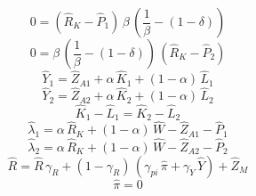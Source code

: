 \begin{dmath}
0=\left({{\hat{R}_{K}}}-{{\hat{P}_{1}}}\right)\, {{\beta}}\, \left(\frac{1}{{{\beta}}}-\left(1-{{\delta}}\right)\right)
\end{dmath}
\begin{dmath}
0={{\beta}}\, \left(\frac{1}{{{\beta}}}-\left(1-{{\delta}}\right)\right)\, \left({{\hat{R}_{K}}}-{{\hat{P}_{2}}}\right)
\end{dmath}
\begin{dmath}
{{\hat{Y}_{1}}}={{\hat{Z}_{A1}}}+{{\alpha}}\, {{\hat{K}_{1}}}+\left(1-{{\alpha}}\right)\, {{\hat{L}_{1}}}
\end{dmath}
\begin{dmath}
{{\hat{Y}_{2}}}={{\hat{Z}_{A2}}}+{{\alpha}}\, {{\hat{K}_{2}}}+\left(1-{{\alpha}}\right)\, {{\hat{L}_{2}}}
\end{dmath}
\begin{dmath}
{{\hat{K}_{1}}}-{{\hat{L}_{1}}}={{\hat{K}_{2}}}-{{\hat{L}_{2}}}
\end{dmath}
\begin{dmath}
{{\hat{\lambda}_{1}}}={{\alpha}}\, {{\hat{R}_{K}}}+\left(1-{{\alpha}}\right)\, {{\hat{W}}}-{{\hat{Z}_{A1}}}-{{\hat{P}_{1}}}
\end{dmath}
\begin{dmath}
{{\hat{\lambda}_{2}}}={{\alpha}}\, {{\hat{R}_{K}}}+\left(1-{{\alpha}}\right)\, {{\hat{W}}}-{{\hat{Z}_{A2}}}-{{\hat{P}_{2}}}
\end{dmath}
\begin{dmath}
{{\hat{R}}}={{\hat{R}}}\, {{\gamma_{R}}}+\left(1-{{\gamma_{R}}}\right)\, \left({{\gamma_{pi}}}\, {{\hat{\pi}}}+{{\gamma_{Y}}}\, {{\hat{Y}}}\right)+{{\hat{Z}_M}}
\end{dmath}
\begin{dmath}
{{\hat{\pi}}}=0
\end{dmath}
